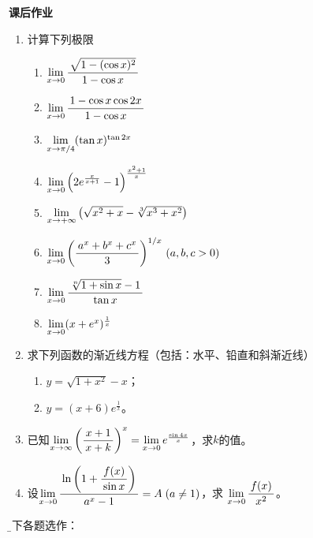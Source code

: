 \begin{ext}
	{\centering\bf 课后作业}
	
	\begin{enumerate}  
	  \item 计算下列极限
	  \begin{enumerate}[(1)]
		\item $\lim\limits_{x\to{0}}\displaystyle\frac{\,{\sqrt{1-(\cos x)^2}}\,}{\,{1-\cos x}\,}$ 
		\item $\lim\limits_{x\to{0}}\displaystyle\frac{\,{1-\cos x\cos 2x}\,}{\,{1-\cos x}\,}$
		\item $\lim\limits_{x\to{\pi /4}}(\tan x)^{\tan 2x}$ 
		\item $\lim\limits_{x\to{0}}\left(2e^{\frac{x}{x+1}}-1\right)^{\frac{x^2+1}{x}}$ 
		\item $\lim\limits_{x\to{+\infty}}\left(\sqrt{x^2+x}-\sqrt[3]{x^3+x^2}\right)$ 
		\item $\lim\limits_{x\to{0}}\left(\displaystyle\frac{\,{a^x+b^x+c^x}\,}{\,{3}\,}\right)^{1/x}\,(a,b,c>0)$  
		\item $\lim\limits_{x\to{0}}\displaystyle\frac{\,{\sqrt[n]{1+\sin x}-1}\,}{\,{\tan x}\,}$
		\item $\lim\limits_{x\to{0}}(x+e^x)^{\frac1x}$
	  \end{enumerate}
	  \item 求下列函数的渐近线方程（包括：水平、铅直和斜渐近线）
	  \begin{enumerate}[(1)]
	    \item $y=\sqrt{1+x^2}-x$；
	    \item $y=(x+6)e^{\frac1x}$。
	  \end{enumerate}
	  \item 已知$\lim\limits_{x\to{\infty}}\left(\displaystyle\frac{\,{x+1}\,}{\,{x+k}\,}\right)^x
	  =\lim\limits_{x\to{0}}e^{\frac{\sin 4x}x}$，求$k$的值。
	  \item 设$\lim\limits_{x\to{0}}\displaystyle\frac{\,{\ln\left(1+\displaystyle\frac{\,{f(x)}\,}{\,{\sin x}\,}\right)}\,}{\,{a^x-1}\,}=A\;(a\ne 1)$，求
		$\lim\limits_{x\to{0}}\displaystyle\frac{\,{f(x)}\,}{\,{x^2}\,}$。
	\end{enumerate}
	\tcblower
	{\kaishu\b 以下各题选作：}
	

\end{ext}
